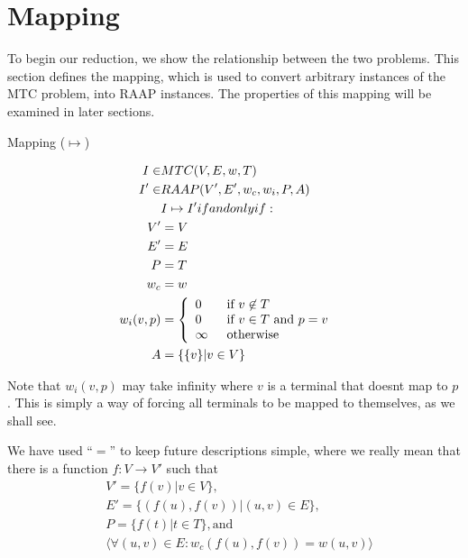\section{Mapping}

To begin our reduction, we show the relationship between the two problems.
This section defines the mapping, which is used to convert arbitrary instances of the MTC problem, into RAAP instances.
The properties of this mapping will be examined in later sections.

\begin{definition}
\label{defHardMap}
Mapping ($\mapsto$)

\begin{align}
	\nonumber I \in & MTC(V,E,w,T) &\\
	\nonumber I' \in & RAAP(V', E', w_c, w_i, P, A) &\\
	\nonumber & I \mapsto I' if and only if: &\\
	\nonumber V' & = V\\
	\nonumber E' & = E\\
	\nonumber P & = T\\
	\nonumber w_c & = w\\
	\nonumber w_i(v,p) & = \mbox{$\left\{ 
		\begin{array}{l l}
			0 \quad & \mbox{if $v \not\in T$}\\
			0 & \mbox{if $v \in T$ and $p = v$}\\
			\infty & \mbox{otherwise}\\ \end{array} \right.$} \\
	\nonumber A & = \{\{v\} | v \in V\}
\end{align}

Note that $w_i(v, p)$ may take infinity where $v$ is a terminal that doesnt map to $p$.
This is simply a way of forcing all terminals to be mapped to themselves, as we shall see.

We have used ``$=$'' to keep future descriptions simple, where we really mean that there is a function $f : V \rightarrow V'$ such that
\begin{align}
	\nonumber & V' = \{f(v) | v \in V\} , \\
	\nonumber & E' = \{(f(u), f(v)) | (u,v) \in E\} , \\
	\nonumber & P = \{f(t) | t \in T\} , \mbox{and} \\
	\nonumber & \langle \forall (u, v) \in E : w_c(f(u), f(v)) = w(u, v) \rangle
\end{align}
\end{definition}

